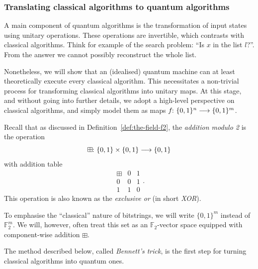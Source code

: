 \documentclass[a4paper, oneside, 12pt]{amsart}
\begin{document}
\subsubsection{Translating classical algorithms to quantum algorithms}\label{sec:translating-classical-algorithms-to-quantum-algorithms}
A main component of quantum algorithms is the transformation of input states using unitary operations.
These operations are invertible, which contrasts with classical algorithms.
Think for example of the search problem: ``Is \( x \) in the list \( l \)?''. From the answer we cannot possibly reconstruct the whole list.

Nonetheless, we will show that an (idealised) quantum machine can at least theoretically execute  every classical algorithm.
This necessitates  a non-trivial process for transforming classical algorithms into unitary maps.
At this stage, and without going into further details, we adopt a high-level perspective on classical algorithms, and simply model them as maps \(f \from \{0,1\}^n \to \{0,1\}^m\).

\begin{remark}\label{rem:addition-modulo-2}
  Recall that as discussed in Definition~\ref{def:the-field-f2}, the
  \emph{addition modulo 2} is the operation
  \begin{equation}
    \boxplus \from\{0,1\}\times\{0,1\} \to\{0,1\}
  \end{equation}
  with addition table
  \begin{equation*}
    \begin{array}{c|cc}
      \boxplus & 0 & 1 \\
      \hline
      0 & 0 & 1 \\
      1 & 1 & 0
    \end{array}.
  \end{equation*}
  This operation is also known as the \emph{exclusive or} (in short \emph{XOR}).
\end{remark}

\begin{convention}
  To emphasise the ``classical'' nature of bitstrings, we will write \(\{0,1\}^{m}\) instead of \(\mathbb{F}_{2}^{m}\).
  We will, however, often treat this set as an \(\mathbb{F}_2\)-vector space equipped with component-wise addition \(\boxplus\).
\end{convention}

The method described below, called \emph{Bennett's trick}, is the first step for turning classical algorithms into quantum ones.
\end{document}
